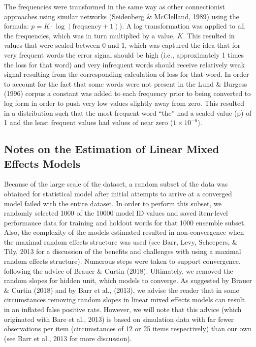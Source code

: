 \documentclass[
  ,man,floatsintext]{apa6}
\begin{document}
The frequencies were transformed in the same way as other connectionist approaches using similar networks (Seidenberg \& McClelland, 1989) using the formula: \(p = K \cdot \log(\text{frequency} + 1)\)). A log transformation was applied to all the frequencies, which was in turn multiplied by a value, \(K\). This resulted in values that were scaled between 0 and 1, which was captured the idea that for very frequent words the error signal should be high (i.e., approximately 1 times the loss for that word) and very infrequent words should receive relatively weak signal resulting from the corresponding calculation of loss for that word. In order to account for the fact that some words were not present in the Lund \& Burgess (1996) corpus a constant was added to each frequency prior to being converted to log form in order to push very low values slightly away from zero. This resulted in a distribution such that the most frequent word ``the'' had a scaled value (p) of 1 and the least frequent values had values of near zero (\(1 \times 10^{-6}\)).

\subsection{Notes on the Estimation of Linear Mixed Effects Models}\label{notes-on-the-estimation-of-linear-mixed-effects-models}

Because of the large scale of the dataset, a random subset of the data was obtained for statistical model after initial attempts to arrive at a converged model failed with the entire dataset. In order to perform this subset, we randomly selected 1000 of the 10000 model ID values and saved item-level performance data for training and holdout words for that 1000 ensemble subset. Also, the complexity of the models estimated resulted in non-convergence when the maximal random effects structure was used (see Barr, Levy, Scheepers, \& Tily, 2013 for a discussion of the benefits and challenges with using a maximal random effects structure). Numerous steps were taken to support convergence, following the advice of Brauer \& Curtin (2018). Ultimately, we removed the random slopes for hidden unit, which models to converge. As suggested by Brauer \& Curtin (2018) and by Barr et al., (2013), we advise the reader that in some circumstances removing random slopes in linear mixed effects models can result in an inflated false positive rate. However, we will note that this advice (which originated with Bare et al., 2013) is based on simulation data with far fewer observations per item (circumstances of 12 or 25 items respectively) than our own (see Barr et al., 2013 for more discussion).
\end{document}
